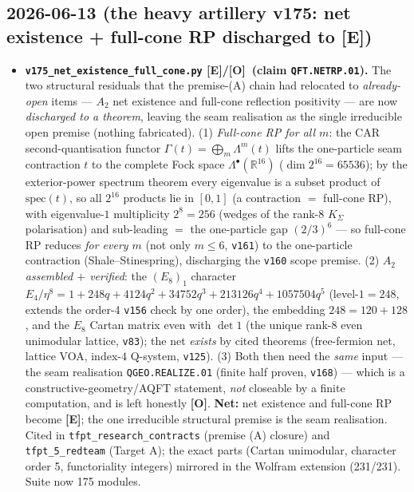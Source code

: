 \documentclass[11pt]{article}
\providecommand{\mE}{\textbf{[E]}}\providecommand{\mC}{\textbf{[C]}}
\providecommand{\mO}{\textbf{[O]}}\providecommand{\mX}{\textbf{[X]}}
\providecommand{\vref}[1]{\texttt{#1}}
\begin{document}
\subsection*{2026-06-13 (the heavy artillery v175: net existence + full-cone RP discharged to [E])}
\begin{itemize}
\item \textbf{\texttt{v175\_net\_existence\_full\_cone.py} \mE/\mO\ (claim \texttt{QFT.NETRP.01}).}
  The two structural residuals that the premise-(A) chain had relocated to \emph{already-open}
  items --- $A_2$ net existence and full-cone reflection positivity --- are now \emph{discharged
  to a theorem}, leaving the seam realisation as the single irreducible open premise (nothing
  fabricated). (1) \emph{Full-cone RP for all $m$}: the CAR second-quantisation functor
  $\Gamma(t)=\bigoplus_m\Lambda^m(t)$ lifts the one-particle seam contraction $t$ to the complete
  Fock space $\Lambda^\bullet(\mathbb R^{16})$ ($\dim 2^{16}=65536$); by the exterior-power
  spectrum theorem every eigenvalue is a subset product of $\mathrm{spec}(t)$, so all $2^{16}$
  products lie in $[0,1]$ (a contraction $=$ full-cone RP), with eigenvalue-$1$ multiplicity
  $2^8=256$ (wedges of the rank-$8$ $K_\Sigma$ polarisation) and sub-leading $=$ the one-particle
  gap $(2/3)^6$ --- so full-cone RP reduces \emph{for every $m$} (not only $m\le6$, \vref{v161}) to
  the one-particle contraction (Shale--Stinespring), discharging the \vref{v160} scope premise.
  (2) \emph{$A_2$ assembled $+$ verified}: the $(E_8)_1$ character
  $E_4/\eta^8=1+248q+4124q^2+34752q^3+213126q^4+1057504q^5$ (level-$1=248$, extends the order-4
  \vref{v156} check by one order), the embedding $248=120+128$, and the $E_8$ Cartan matrix even
  with $\det 1$ (the unique rank-$8$ even unimodular lattice, \vref{v83}); the net \emph{exists} by
  cited theorems (free-fermion net, lattice VOA, index-$4$ Q-system, \vref{v125}). (3) Both then
  need the \emph{same} input --- the seam realisation \texttt{QGEO.REALIZE.01} (finite half proven,
  \vref{v168}) --- which is a constructive-geometry/AQFT statement, \emph{not} closeable by a finite
  computation, and is left honestly \mO. \textbf{Net:} net existence and full-cone RP become \mE;
  the one irreducible structural premise is the seam realisation. Cited in
  \texttt{tfpt\_research\_contracts} (premise (A) closure) and \texttt{tfpt\_5\_redteam} (Target A);
  the exact parts (Cartan unimodular, character order 5, functoriality integers) mirrored in the
  Wolfram extension (231/231). Suite now 175 modules.
\end{itemize}
\end{document}
